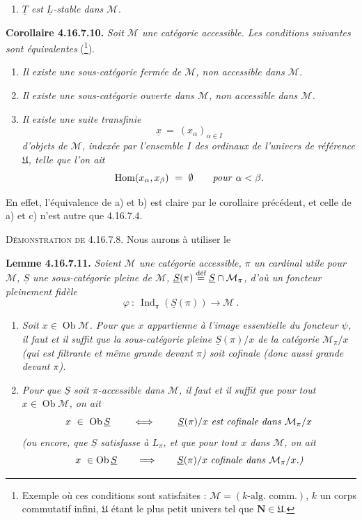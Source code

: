 \documentclass[11pt]{article}
\newcommand{\printedpage}[1]{\marginpar{\footnotesize p.~#1}}
\newcommand{\msp}[1]{\marginpar{\footnotesize [#1]}}
\newcommand{\cM}{\mathcal{M}}
\newcommand{\Ob}{\operatorname{Ob}}
\newcommand{\Hom}{\operatorname{Hom}}
\newcommand{\Ind}{\operatorname{Ind}}
\newcommand{\defeq}{\overset{\text{\upshape déf}}{=}}
\begin{document}
\printedpage{189}

\begin{enumerate}
\item[\textit{b$'$)}] \textit{$\underline{T}$ est $\underline{L}$-stable dans $\cM$.}
\end{enumerate}

\noindent\textbf{Corollaire 4.16.7.10.} \textit{Soit $\cM$ une catégorie accessible. Les conditions suivantes sont équivalentes} (\footnote[202]{Exemple où ces conditions sont satisfaites : $\cM = (k\text{-alg. comm.})$, $k$ un corps commutatif infini, $\mathfrak{U}$ étant le plus petit univers tel que $\mathbf{N}\in\mathfrak{U}$.}).
\begin{enumerate}
\item[\textit{a)}] \textit{Il existe une sous-catégorie fermée de $\cM$, non accessible dans $\cM$.}
\item[\textit{b)}] \textit{Il existe une sous-catégorie ouverte dans $\cM$, non accessible dans $\cM$.}
\item[\textit{c)}] \textit{Il existe une suite transfinie}
\[
\underline{x} \ = \ (x_\alpha)_{\alpha\in I}
\]
\textit{d'objets de $\cM$, indexée par l'ensemble $I$ des ordinaux de l'univers de référence $\mathfrak{U}$, telle que l'on ait}
\[
\Hom(x_\alpha,x_\beta) \ = \ \emptyset \qquad \text{\textit{pour} } \alpha<\beta .
\]
\end{enumerate}

\noindent En effet, l'équivalence de a) et b) est claire par le corollaire précédent, et celle de a) et c) n'est autre que 4.16.7.4.

\noindent\textsc{Démonstration de} 4.16.7.8. Nous aurons à utiliser le

\noindent\textbf{Lemme 4.16.7.11.} \textit{Soient $\cM$ une catégorie accessible, $\pi$ un cardinal utile pour $\cM$, $\underline{S}$ une sous-catégorie pleine de $\cM$, $\underline{S}(\pi)\defeq\underline{S}\cap\cM_\pi$, d'où un foncteur pleinement fidèle}
\[
\varphi \ : \ \Ind_\pi(\underline{S}(\pi)) \longrightarrow \cM \ .
\]

\msp{page 489}
\begin{enumerate}
\item[\textit{a)}] \textit{Soit $x\in\Ob\cM$. Pour que $x$ appartienne à l'image essentielle du foncteur $\psi$, il faut et il suffit que la sous-catégorie pleine $\underline{S}(\pi)/x$ de la catégorie $\cM_\pi/x$ (qui est filtrante et même grande devant $\pi$) soit cofinale (donc aussi grande devant $\pi$).} %
\item[\textit{b)}] \textit{Pour que $\underline{S}$ soit $\pi$-accessible dans $\cM$, il faut et il suffit que pour tout $x\in\Ob\cM$, on ait}
\[
x \ \in \ \Ob\underline{S} \qquad\iff\qquad \underline{S}(\pi)/x \text{ \textit{est cofinale dans} } \cM_\pi/x
\]
\textit{(ou encore, que $\underline{S}$ satisfasse à $L_\pi$, et que pour tout $x$ dans $\cM$, on ait}
\[
x \ \in\Ob\underline{S} \qquad\Longrightarrow\qquad \underline{S}(\pi)/x \text{ \textit{cofinale dans} } \cM_\pi/x\text{\textit{.)}}
\]
\end{enumerate}
\end{document}
